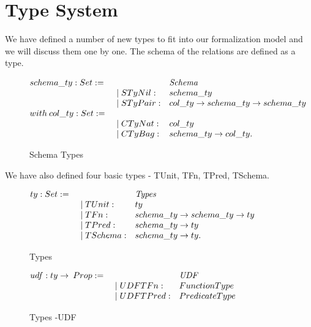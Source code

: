 \section{Type System}
\label{sec:types}

We have defined a number of new types to fit into our formalization model and we will discuss them one by one. The schema of the relations are defined as a type.
\begin{figure}
\begin{center}
$\begin{array}{@{}l@{~}l@{\quad}l@{\!\!\!\!\!\!}r}
schema\_ty : Set := & \ \ \ \ \ & \emph{Schema} \\
& \quad \mid STyNil: & schema\_ty\\
& \quad \mid STyPair: & col\_ty \rightarrow schema\_ty \rightarrow schema\_ty\\
with \:col\_ty : Set := & & \\
& \quad \mid CTyNat: & col\_ty\\
& \quad \mid CTyBag: & schema\_ty \rightarrow col\_ty. \\
\end{array}
$
\end{center}
\caption{Schema Types}
\label{fig-schema_types}
\end{figure}

We have also defined four basic types - TUnit, TFn, TPred, TSchema.

\begin{figure}
\begin{center}
$\begin{array}{@{}l@{~}l@{\quad}l@{\!\!\!\!\!\!}r}
ty : Set := & \ \ \ \ \ & \emph{Types} \\
& \quad \mid TUnit: & ty\\
& \quad \mid TFn: & schema\_ty \rightarrow schema\_ty \rightarrow ty\\
& \quad \mid TPred: & schema\_ty \rightarrow ty\\
& \quad \mid TSchema: & schema\_ty \rightarrow ty. \\
\end{array}
$
\end{center}
\caption{Types}
\label{fig-types}
\end{figure} 

\begin{figure}
\begin{center}
	$\begin{array}{@{}l@{~}l@{\quad}l@{\!\!\!\!\!\!}r}
	udf : ty \rightarrow \:Prop := & \ \ \ \ \ & \emph{UDF} \\
	& \quad \mid UDFTFn: & Function Type\\
	& \quad \mid UDFTPred: & Predicate Type\\
	\end{array}$
\end{center}
\caption{Types -UDF}
\label{fig-udf}
\end{figure}

